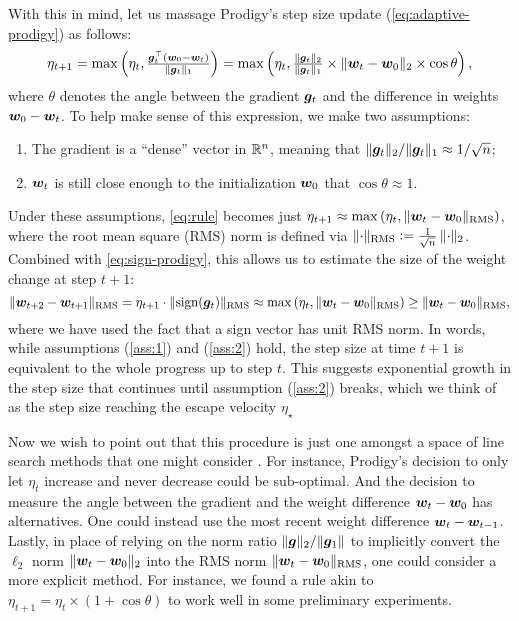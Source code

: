 With this in mind, let us massage Prodigy's step size update (\cref{eq:adaptive-prodigy}) as follows:
\begin{align}\label{eq:rule}
    \eta_{t+1} = \max\left(\eta_t, \tfrac{{\bm{g}}_t^\top({\bm{w}}_0 - {\bm{w}}_t)}{\Vert {{\bm{g}}_t} \Vert_1}\right) = \max\left(\eta_t, \tfrac{\Vert {{\bm{g}}_t} \Vert_2}{\Vert {{\bm{g}}_t} \Vert_1}\times \Vert {{\bm{w}}_t - {\bm{w}}_0} \Vert_2 \times \cos\theta\right),
\end{align}
where $\theta$ denotes the angle between the gradient ${\bm{g}}_t$ and the difference in weights ${\bm{w}}_0 - {\bm{w}}_t$. To help make sense of this expression, we make two assumptions:
\begin{enumerate}
    \item The gradient is a ``dense'' vector in $\mathbb{R}^n$, meaning that $\Vert {{\bm{g}}_t} \Vert_2 / \Vert {{\bm{g}}_t} \Vert_1 \approx  1/ \sqrt{n}$; \label{ass:1}
    \item ${\bm{w}}_t$ is still close enough to the initialization ${\bm{w}}_0$ that $\cos\theta \approx 1$. \label{ass:2}
\end{enumerate}
Under these assumptions, \cref{eq:rule} becomes just $\eta_{t+1} \approx \max\left(\eta_t, \Vert {{\bm{w}}_t - {\bm{w}}_0} \Vert_{\mathrm{RMS}}\right)$, where the root mean square (RMS) norm is defined via $\Vert {\cdot} \Vert_{\mathrm{RMS}} \vcentcolon= \tfrac{1}{\sqrt{n}}\,\Vert {\cdot} \Vert_2$. Combined with \cref{eq:sign-prodigy}, this allows us to estimate the size of the weight change at step $t+1$:
\begin{equation*}
    \Vert {{\bm{w}}_{t+2} - {\bm{w}}_{t+1}} \Vert_{\mathrm{RMS}} = \eta_{t+1} \cdot \Vert {\operatorname{sign}({\bm{g}}_t)} \Vert_{\mathrm{RMS}} \approx \max\left(\eta_t, \Vert {{\bm{w}}_t - {\bm{w}}_0} \Vert_{\mathrm{RMS}}\right) \geq \Vert {{\bm{w}}_t - {\bm{w}}_0} \Vert_{\mathrm{RMS}},
\end{equation*}
where we have used the fact that a sign vector has unit RMS norm. In words, while assumptions (\ref{ass:1}) and (\ref{ass:2}) hold, the step size at time $t+1$ is equivalent to the whole progress up to step $t$. This suggests exponential growth in the step size that continues until assumption (\ref{ass:2}) breaks, which we think of as the step size reaching the escape velocity $\eta_\star$

Now we wish to point out that this procedure is just one amongst a space of line search methods that one might consider \citep{armijo1966,rprop,kenneweg2024}. For instance, Prodigy's decision to only let $\eta_t$ increase and never decrease could be sub-optimal. And the decision to measure the angle between the gradient and the weight difference ${\bm{w}}_t - {\bm{w}}_0$ has alternatives. One could instead use the most recent weight difference ${\bm{w}}_t - {\bm{w}}_{t-1}$. Lastly, in place of relying on the norm ratio $\Vert {{\bm{g}}} \Vert_2/\Vert {{\bm{g}}_1} \Vert$ to implicitly convert the $\ell_2$ norm $\Vert {{\bm{w}}_t -{\bm{w}}_0} \Vert_2$ into the RMS norm $\Vert {{\bm{w}}_t -{\bm{w}}_0} \Vert_{\mathrm{RMS}}$, one could consider a more explicit method. For instance, we found a rule akin to $\eta_{t+1} = \eta_t \times (1 + \cos\theta)$ to work well in some preliminary experiments.

